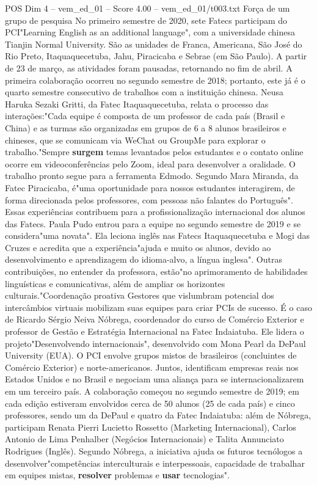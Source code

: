 \begin{textsample}{POS Dim 4 – vem\_ed\_01 – Score 4.00 – vem\_ed\_01/t003.txt}  \label{ex:f4_pos_016}
Força de um grupo de pesquisa No primeiro semestre de 2020, sete Fatecs participam do PCI"Learning English as an additional language", com a universidade chinesa Tianjin Normal University.
São as unidades de Franca, Americana, São José do Rio Preto, Itaquaquecetuba, Jahu, Piracicaba e Sebrae (em São Paulo).
A partir de 23 de março, as atividades foram pausadas, retornando no fim de abril.
A primeira colaboração ocorreu no segundo semestre de 2018; portanto, este já é o quarto semestre consecutivo de trabalhos com a instituição chinesa.
Neusa Haruka Sezaki Gritti, da Fatec Itaquaquecetuba, relata o processo das interações:"Cada equipe é composta de um professor de cada país (Brasil e China) e as turmas são organizadas em grupos de 6 a 8 alunos brasileiros e chineses, que se comunicam via WeChat ou GroupMe para explorar o trabalho."Sempre \textbf{surgem} temas levantados pelos estudantes e o contato online ocorre em videoconferências pelo Zoom, ideal para desenvolver a oralidade.
O trabalho pronto segue para a ferramenta Edmodo.
Segundo Mara Miranda, da Fatec Piracicaba, é"uma oportunidade para nossos estudantes interagirem, de forma direcionada pelos professores, com pessoas não falantes do Português".
Essas experiências contribuem para a profissionalização internacional dos alunos das Fatecs.
Paula Pudo entrou para a equipe no segundo semestre de 2019 e se considera"uma novata".
Ela leciona inglês nas Fatecs Itaquaquecetuba e Mogi das Cruzes e acredita que a experiência"ajuda e muito os alunos, devido ao desenvolvimento e aprendizagem do idioma-alvo, a língua inglesa".
Outras contribuições, no entender da professora, estão"no aprimoramento de habilidades linguísticas e comunicativas, além de ampliar os horizontes culturais."Coordenação proativa Gestores que vislumbram potencial dos intercâmbios virtuais mobilizam suas equipes para criar PCIs de sucesso.
É o caso de Ricardo Sérgio Neiva Nóbrega, coordenador do curso de Comércio Exterior e professor de Gestão e Estratégia Internacional na Fatec Indaiatuba.
Ele lidera o projeto"Desenvolvendo internacionais", desenvolvido com Mona Pearl da DePaul University (EUA).
O PCI envolve grupos mistos de brasileiros (concluintes de Comércio Exterior) e norte-americanos.
Juntos, identificam empresas reais nos Estados Unidos e no Brasil e negociam uma aliança para se internacionalizarem em um terceiro país.
A colaboração começou no segundo semestre de 2019; em cada edição estiveram envolvidos cerca de 50 alunos (25 de cada país) e cinco professores, sendo um da DePaul e quatro da Fatec Indaiatuba: além de Nóbrega, participam Renata Pierri Lucietto Rossetto (Marketing Internacional), Carlos Antonio de Lima Penhalber (Negócios Internacionais) e Talita Annunciato Rodrigues (Inglês).
Segundo Nóbrega, a iniciativa ajuda os futuros tecnólogos a desenvolver"competências interculturais e interpessoais, capacidade de trabalhar em equipes mistas, \textbf{resolver} problemas e \textbf{usar} tecnologias".

\end{textsample}
